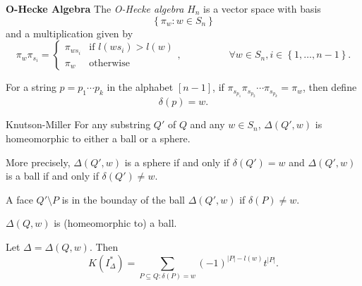 \documentclass[co439]{subfiles}
\begin{document}
    \begin{definition}{\textbf{O-Hecke Algebra}}
        The \emph{O-Hecke algebra} $H_n$ is a vector space with basis
        \begin{equation*}
            \left\lbrace \pi_w: w\in S_n \right\rbrace
        \end{equation*}
        and a multiplication given by
        \begin{equation*}
            \pi_w\pi_{s_i} = \begin{cases} \pi_{ws_i} & \text{if $l\left( ws_i \right)>l\left( w \right)$} \\ \pi_w & \text{otherwise} \end{cases} , \hspace{2cm}\forall w\in S_n, i\in\left\lbrace 1,\ldots,n-1 \right\rbrace.
        \end{equation*}
    \end{definition}
    
    \np For a string $p = p_1\cdots p_k$ in the alphabet $\left[ n-1 \right]$, if $\pi_{s_{p_1}}\pi_{s_{p_2}}\cdots \pi_{s_{p_k}} = \pi_w$, then define
    \begin{equation*}
        \delta\left( p \right) = w.
    \end{equation*}
    
    \begin{theorem}{Knutson-Miller}
        For any substring $Q'$ of $Q$ and any $w\in S_n$, $\Delta\left( Q',w \right)$ is homeomorphic to either a ball or a sphere.

        More precisely, $\Delta\left( Q',w \right)$ is a sphere if and only if $\delta\left( Q' \right)=w$ and $\Delta\left( Q',w \right)$ is a ball if and only if $\delta\left( Q' \right)\neq w$.

        A face $Q'\setminus P$ is in the bounday of the ball $\Delta\left( Q',w \right)$ if $\delta\left( P \right)\neq w$.
    \end{theorem}
    
    \rruleline
    
    \begin{cor}{}
        $\Delta\left( Q,w \right)$ is (homeomorphic to) a ball.
    \end{cor}	

    \rruleline

    \begin{lemma}{}
        Let $\Delta = \Delta\left( Q,w \right)$. Then
        \begin{equation*}
            K\left( I_{\Delta}^{*} \right) = \sum^{}_{P\subseteq Q: \delta\left( P \right)=w} \left( -1 \right)^{\left| P \right|-l\left( w \right)}t^{\left| P \right|}.
        \end{equation*}
    \end{lemma}
\end{document}
